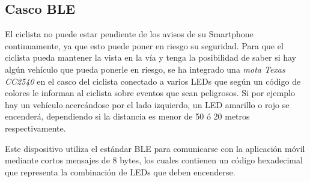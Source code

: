 \subsection{Casco BLE}\label{ssection:cascoBLE}
El ciclista no puede estar pendiente de los avisos de su Smartphone continuamente, ya que esto puede poner en riesgo su seguridad. Para que el ciclista pueda mantener la vista en la vía y tenga la posibilidad de saber si hay algún vehículo que pueda ponerle en riesgo, se ha integrado una \emph{mota Texas CC2540} en el casco del ciclista conectado a varios LEDs que según un código de colores le informan al ciclista sobre eventos que sean peligrosos. Si por ejemplo hay un vehículo acercándose por el lado izquierdo, un LED amarillo o rojo se encenderá, dependiendo si la distancia es menor de 50 ó 20 metros respectivamente.

Este dispositivo utiliza el estándar BLE para comunicarse con la aplicación móvil mediante cortos mensajes de 8 bytes, los cuales contienen un código hexadecimal que representa la combinación de LEDs que deben encenderse. %

